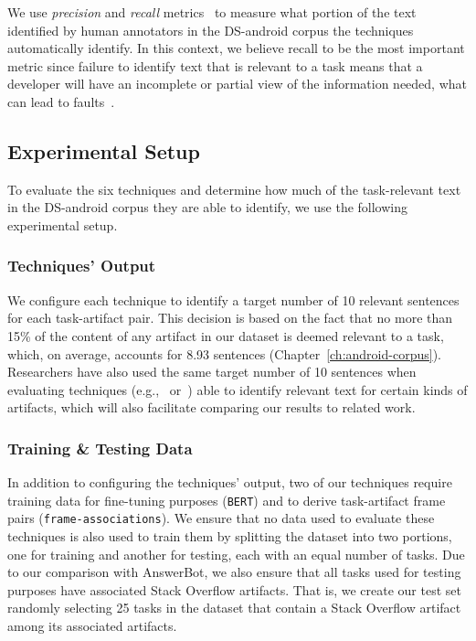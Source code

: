 We use \textit{precision} and \textit{recall} metrics~\cite{manning2010IR} to measure what portion of the text identified by human annotators in the \acs{DS-android} corpus the techniques automatically identify.
In this context, we believe recall to be the most important metric since failure to identify text that is relevant to a task means that a developer will have an incomplete or partial view of the information needed,
what can lead to faults~\cite{Murphy2005}.




\subsection{Experimental Setup}
\label{cp5:config}

To evaluate the six techniques and determine how much of the task-relevant text in the \acs{DS-android} corpus they are able to identify, we use the following experimental setup.

\subsubsection{Techniques' Output}


We configure each technique to identify a target number of 10 relevant sentences for each task-artifact pair.
This decision is based on the fact that no more than 15\% of the content of any artifact in our dataset is deemed relevant to a task, which, on average, accounts for 8.93 sentences (Chapter~\ref{ch:android-corpus}).
Researchers have also used the same target number of 10 sentences when evaluating techniques  (e.g.,~\cite{Xu2017} or~\cite{Lotufo2012}) able to identify relevant text for certain kinds of artifacts, which will also facilitate comparing our results to related work.


\subsubsection{Training \& Testing Data}


In addition to configuring the techniques' output, two of our techniques require training data for fine-tuning purposes (\texttt{BERT}) and to derive task-artifact frame pairs (\texttt{frame-associations}).
We ensure that no data used to evaluate these techniques is also used to train them by 
splitting the dataset into two portions, one for training and another for testing, each with an equal number of tasks.
Due to our comparison with AnswerBot, we also ensure that all tasks used for testing purposes have associated Stack Overflow artifacts.
That is, we create our test set randomly selecting 25 tasks in the dataset that contain a 
Stack Overflow artifact among its associated artifacts.


